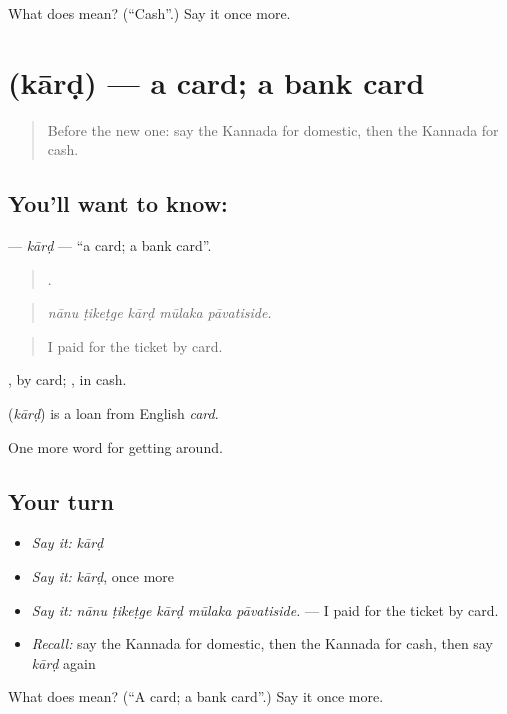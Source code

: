 \begin{tcolorbox}[breakable,colback=teal!4,colframe=teal!35!black,title={Before you move on}]
What does  mean? (\textquotedblleft{}Cash\textquotedblright{}.) Say it once more.
\end{tcolorbox}
\section[\texorpdfstring{\kn{ಕಾರ್ಡ್} (kārḍ)}{ಕಾರ್ಡ್ (kārḍ)}]{ (kārḍ) — a card; a bank card}

\label{lesson:KA-C441-kard}



\begin{quote}
Before the new one: say the Kannada for domestic, then the Kannada for cash.
\end{quote}

\subsection*{You'll want to know: }
\textbf{} — \emph{kārḍ} — \textquotedblleft{}a card; a bank card\textquotedblright{}.

\begin{quote}
    .
\end{quote}

\begin{quote}
\emph{nānu ṭikeṭge kārḍ mūlaka pāvatiside.}
\end{quote}

\begin{quote}
I paid for the ticket by card.
\end{quote}

 , by card; , in cash.

\begin{cousinweb}
\textbf{} (\emph{kārḍ}) is a loan from English \emph{card}.
\end{cousinweb}

\begin{grammarlens}[title={What you've built}]
One more word for getting around.
\end{grammarlens}

\subsection*{Your turn}
\begin{itemize}
\raggedright
  \item \emph{Say it:} \emph{kārḍ}
  \item \emph{Say it:} \emph{kārḍ}, once more
  \item \emph{Say it:} \emph{nānu ṭikeṭge kārḍ mūlaka pāvatiside.} — I paid for the ticket by card.
  \item \emph{Recall:} say the Kannada for domestic, then the Kannada for cash, then say \emph{kārḍ} again
\end{itemize}

\begin{tcolorbox}[breakable,colback=teal!4,colframe=teal!35!black,title={Before you move on}]
What does  mean? (\textquotedblleft{}A card; a bank card\textquotedblright{}.) Say it once more.
\end{tcolorbox}

